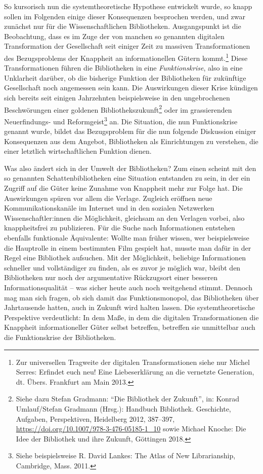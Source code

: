 \documentclass[a4paper,
fontsize=11pt,
oneside,
numbers=noperiodatend,
parskip=half-,
bibliography=totoc,
final
]{scrartcl}
\begin{document}
So kursorisch nun die systemtheoretische Hypothese entwickelt wurde, so
knapp sollen im Folgenden einige dieser Konsequenzen besprochen werden,
und zwar zunächst nur für die Wissenschaftlichen Bibliotheken.
Ausgangspunkt ist die Beobachtung, dass es im Zuge der von manchen so
genannten digitalen Transformation der Gesellschaft seit einiger Zeit zu
massiven Transformationen des Bezugsproblems der Knappheit an
informationellen Gütern kommt.\footnote{Zur universellen Tragweite der
  digitalen Transformationen siehe nur Michel Serres: Erfindet euch neu!
  Eine Liebeserklärung an die vernetzte Generation, dt. Übers. Frankfurt
  am Main 2013.} Diese Transformationen führen die Bibliotheken in eine
\emph{Funktionskrise}, also in eine Unklarheit darüber, ob die bisherige
Funktion der Bibliotheken für zukünftige Gesellschaft noch angemessen
sein kann. Die Auswirkungen dieser Krise kündigen sich bereits seit
einigen Jahrzehnten beispielsweise in den ungebrochenen Beschwörungen
einer goldenen Bibliothekszukunft\footnote{Siehe dazu Stefan Gradmann:
  \enquote{Die Bibliothek der Zukunft}, in: Konrad Umlauf/Stefan
  Gradmann (Hrsg.): Handbuch Bibliothek. Geschichte, Aufgaben,
  Perspektiven, Heidelberg 2012, 387--397,
  \url{https://doi.org/10.1007/978-3-476-05185-1_10} sowie Michael
  Knoche: Die Idee der Bibliothek und ihre Zukunft, Göttingen 2018.}
oder im grassierenden Neuerfindungs- und Reformgeist\footnote{Siehe
  beispielsweise R. David Lankes: The Atlas of New Librarianship,
  Cambridge, Mass. 2011.} an. Die Situation, die nun Funktionskrise
genannt wurde, bildet das Bezugsproblem für die nun folgende Diskussion
einiger Konsequenzen aus dem Angebot, Bibliotheken als Einrichtungen zu
verstehen, die einer letztlich wirtschaftlichen Funktion dienen.

Was also ändert sich in der Umwelt der Bibliotheken? Zum einen scheint
mit den so genannten Schattenbibliotheken eine Situation entstanden zu
sein, in der ein Zugriff auf die Güter keine Zunahme von Knappheit mehr
zur Folge hat. Die Auswirkungen spüren vor allem die Verlage. Zugleich
eröffnen neue Kommunikationskanäle im Internet und in den sozialen
Netzwerken Wissenschaftler:innen die Möglichkeit, gleichsam an den
Verlagen vorbei, also knappheitsfrei zu publizieren. Für die Suche nach
Informationen entstehen ebenfalls funktionale Äquivalente: Wollte man
früher wissen, wer beispielsweise die Hauptrolle in einem bestimmten
Film gespielt hat, musste man dafür in der Regel eine Bibliothek
aufsuchen. Mit der Möglichkeit, beliebige Informationen schneller und
vollständiger zu finden, als es zuvor je möglich war, bleibt den
Bibliotheken nur noch der argumentative Rückzugsort einer besseren
Informationsqualität -- was sicher heute auch noch weitgehend stimmt.
Dennoch mag man sich fragen, ob sich damit das Funktionsmonopol, das
Bibliotheken über Jahrtausende hatten, auch in Zukunft wird halten
lassen. Die systemtheoretische Perspektive verdeutlicht: In dem Maße, in
dem die digitalen Transformationen die Knappheit informationeller Güter
selbst betreffen, betreffen sie unmittelbar auch die Funktionskrise der
Bibliotheken.
\end{document}
